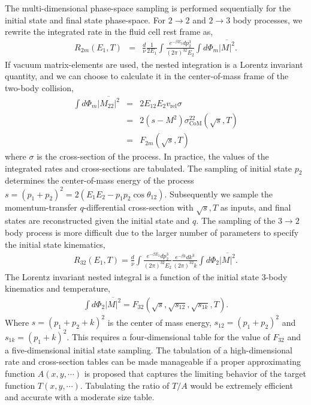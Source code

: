 The multi-dimensional phase-space sampling is performed sequentially for the initial state and final state phase-space.
For $2\rightarrow 2$ and $2\rightarrow 3$ body processes, we rewrite the integrated rate in the fluid cell rest frame as,
\begin{eqnarray}
R_{2m}(E_1, T) &=& \frac{d}{\nu} \frac{1}{2E_1}\int \frac{e^{-\beta E_2}dp_2^3}{(2\pi)^32E_2} 
\int d\Phi_m\overline{|M|^2}.
\end{eqnarray}
If vacuum matrix-elements are used, the nested integration is a Lorentz invariant quantity, and we can choose to calculate it in the center-of-mass frame of the two-body collision, 
\begin{eqnarray}
\int d\Phi_m\overline{|M_{22}|^2} &=& 2E_12E_2v_{\textrm{rel}}\sigma \nonumber \\
 &=& 2(s-M^2)\sigma_{\textrm{CoM}}^{22}(\sqrt{s}, T)\nonumber \\
  &=& F_{2m}(\sqrt{s}, T)
\end{eqnarray}
where $\sigma$ is the cross-section of the process.
In practice, the values of the integrated rates and cross-sections are tabulated. 
The sampling of initial state $p_2$ determines the center-of-mass energy of the process $s = (p_1+p_2)^2 = 2(E_1 E_2 - p_1p_2 \cos\theta_{12})$.
Subsequently we sample the momentum-transfer $q$-differential cross-section with $\sqrt{s}, T$ as inputs, and final states are reconstructed given the initial state and $q$.
The sampling of the $3\rightarrow 2$ body process is more difficult due to the larger number of parameters to specify the initial state kinematics,
\begin{eqnarray}
R_{32}(E_1, T) = \frac{d}{\nu} \int \frac{e^{-\beta E_2}dp_2^3}{(2\pi)^32E_2} \frac{e^{-\beta k}dk^3}{(2\pi)^32k}
\int d\Phi_2\overline{|M|^2}.
\end{eqnarray}
The Lorentz invariant nested integral is a function of the initial state 3-body kinematics and temperature,
\begin{eqnarray}
\int d\Phi_2\overline{|M|^2} = F_{32}(\sqrt{s}, \sqrt{s_{12}}, \sqrt{s_{1k}}, T).
\end{eqnarray}
Where $s = (p_1+p_2+k)^2$ is the center of mass energy, $s_{12} = (p_1+p_2)^2$ and $s_{1k} = (p_1+k)^2$.
This requires a four-dimensional table for the value of $F_{32}$ and a five-dimensional initial state sampling.
The tabulation of a high-dimensional rate and cross-section tables can be made manageable if a proper approximating function $A(x, y, \cdots)$ is proposed that captures the limiting behavior of the target function $T(x, y, \cdots)$.
Tabulating the ratio of $T/A$ would be extremely efficient and accurate with a moderate size table.

